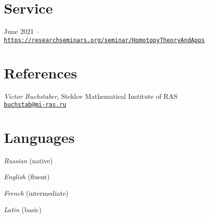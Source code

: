 \documentclass[11pt,letterpaper]{report}
\newcommand{\listitemspace}{0.25em}
\renewenvironment{itemize}
{\begin{list}{}{\setlength{\leftmargin}{0em}
                \setlength{\parskip}{0em}
                \setlength{\itemsep}{\listitemspace}
                \setlength{\parsep}{\listitemspace}}}
{\end{list}}
\begin{document}
    
   




    \section*{Service}

    \begin{tablist}

       \item{June 2021 --} \\ \href{https://researchseminars.org/seminar/HomotopyTheoryAndApps}{\tt https://researchseminars.org/seminar/HomotopyTheoryAndApps} 

    \end{tablist}
    
    
    
    
    
    \section*{References}

    \begin{itemize}

       \item[] {\it Victor Buchstaber}, Steklov Mathematical Institute of RAS\\ \href{mailto:buchstab@mi-ras.ru}{\tt buchstab@mi-ras.ru} 

    \end{itemize}
    
    
    
    
    
     \section*{Languages}

    \begin{itemize}

       \item[] {\it Russian} (native)
       \item[] {\it English} (fluent)
       \item[] {\it French} (intermediate)
       \item[] {\it Latin} (basic)

    \end{itemize}

  

      
\end{document}

